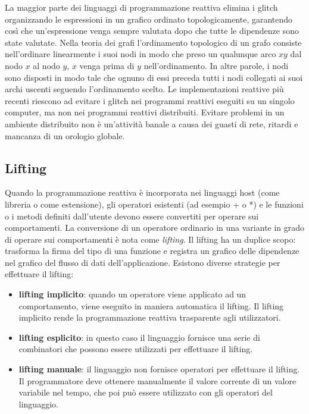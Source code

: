 \documentclass[12pt,a4paper,openright,twoside]{book}
\begin{document}
La maggior parte dei linguaggi di programmazione reattiva elimina i glitch organizzando le espressioni in un grafico ordinato topologicamente, garantendo così che un'espressione venga sempre valutata dopo che tutte le dipendenze sono state valutate. 
Nella teoria dei grafi l'ordinamento topologico di un grafo consiste nell'ordinare linearmente i suoi nodi in modo che preso un qualunque arco $xy$ dal nodo $x$ al nodo $y$, $x$ venga prima di $y$ nell'ordinamento. In altre parole, i nodi sono disposti in modo tale che ognuno di essi preceda tutti i nodi collegati ai suoi archi uscenti seguendo l'ordinamento scelto.
Le implementazioni reattive più recenti riescono ad evitare i glitch nei programmi reattivi eseguiti su un singolo computer, ma non nei programmi reattivi distribuiti. Evitare problemi in un ambiente distribuito non è un'attività banale a causa dei guasti di rete, ritardi e mancanza di un orologio globale. 

\subsection{Lifting}
Quando la programmazione reattiva è incorporata nei linguaggi host (come libreria o come estensione), gli operatori esistenti (ad esempio + o *) e le funzioni o i metodi definiti dall'utente devono essere convertiti per operare sui comportamenti. 
La conversione di un operatore ordinario in una variante in grado di operare sui comportamenti è nota come \textit{lifting}. 
Il lifting ha un duplice scopo: trasforma la firma del tipo di una funzione e registra un grafico delle dipendenze nel grafico del flusso di dati dell'applicazione. 
Esistono diverse strategie per effettuare il lifting: 
\begin{itemize}
    \item \textbf{lifting implicito}: quando un operatore viene applicato ad un comportamento, viene eseguito in maniera automatica il lifting. Il lifting implicito rende la programmazione reattiva trasparente agli utilizzatori. 
    \item \textbf{lifting esplicito}: in questo caso il linguaggio fornisce una serie di combinatori che possono essere utilizzati per effettuare il lifting.
    \item \textbf{lifting manuale}: il linguaggio non fornisce operatori per effettuare il lifting. Il programmatore deve ottenere manualmente il valore corrente di un valore variabile nel tempo, che poi può essere utilizzato con gli operatori del linguaggio. 
\end{itemize}
\end{document}
